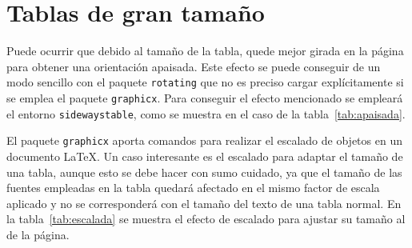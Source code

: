 \documentclass[ 		%
	11pt,				%
	a4paper,			%
	twoside,			%
	openright,			%
	final       		%
]{book}
\begin{document}
\section{Tablas de gran tamaño}
Puede ocurrir que debido al tamaño de la tabla, quede mejor girada en la página para obtener una orientación apaisada. Este efecto se puede conseguir de un modo sencillo con el paquete \texttt{rotating} que no es preciso cargar explícitamente si se emplea el paquete \texttt{graphicx}. Para conseguir el efecto mencionado se empleará el entorno \texttt{sidewaystable}, como se muestra en el caso de la tabla~\ref{tab:apaisada}.

El paquete \texttt{graphicx} aporta comandos para realizar el escalado de objetos en un documento \LaTeX. Un caso interesante es el escalado para adaptar el tamaño de una tabla, aunque esto se debe hacer con sumo cuidado, ya que el tamaño de las fuentes empleadas en la tabla quedará afectado en el mismo factor de escala aplicado y no se corresponderá con el tamaño del texto de una tabla normal. En la tabla~\ref{tab:escalada} se muestra el efecto de escalado para ajustar su tamaño al de la página.
\end{document}
